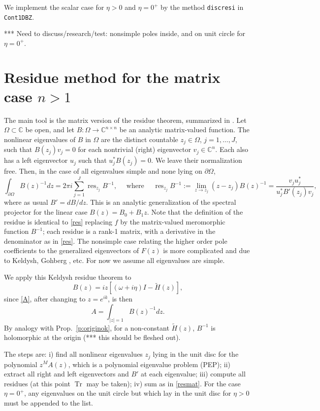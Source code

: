 \documentclass[11pt]{article}
\newcommand{\be}{\begin{equation}}
\newcommand{\ee}{\end{equation}}
\newcommand{\C}{\mathbb{C}}
\DeclareMathOperator{\tr}{Tr}
\DeclareMathOperator{\res}{res}
\newcommand{\om}{\omega}
\newcommand{\tH}{\tilde H}
\begin{document}
We implement the scalar case for $\eta>0$ and $\eta=0^+$
by the method \texttt{discresi} in \texttt{Cont1DBZ}.



*** Need to discuss/research/test: nonsimple poles inside, and on unit circle
for $\eta=0^+$.




\section{Residue method for the matrix case $n>1$}


The main tool is the matrix version of the residue theorem,
summarized in \cite[Thm.~2.9]{beyn12}.
Let $\Omega \subset \C$ be open, and let
$B: \Omega \to \C^{n\times n}$ be an analytic matrix-valued function.
The nonlinear eigenvalues of $B$ in $\Omega$ are the distinct
countable $z_j\in\Omega$, $j=1,\dots,J$, such that
$B(z_j)v_j = 0$ for each nontrivial (right) eigenvector $v_j\in\C^n$.
Each also has a left eigenvector $u_j$ such that $u_j^*B(z_j) = 0$.
We leave their normalization free.
Then, in the case of all eigenvalues simple and none lying on $\partial\Omega$,
\be
\int_{\partial\Omega} B(z)^{-1} dz =
2\pi i \sum_{j=1}^J \res_{z_j} B^{-1},
\quad \mbox{ where }
\quad
\res_{z_j} B^{-1} := \lim_{z\to z_j} (z-z_j)B(z)^{-1}
= \frac{v_j u_j^*}{u_j^* B'(z_j) v_j},
\label{resmat}
\ee
where as usual $B'=dB/dz$.
This is an analytic generalization of the spectral projector for the linear
case $B(z) = B_0 + B_1z$.
Note that the definition of the residue is identical
to \eqref{res} replacing $f$ by the matrix-valued meromorphic
function $B^{-1}$; each residue is a rank-1 matrix,
with a derivative in the denominator as in \eqref{res}.
The nonsimple case relating the higher order pole
coefficients to the generalized eigenvectors of $F(z)$
is more complicated and due to Keldysh, Gohberg \cite{gohberg}, etc.
For now we assume all eigenvalues are simple.

We apply this Keldysh residue theorem to
$$
B(z) = iz[(\om+i\eta)I - \tH(z)],
$$
since \eqref{A}, after changing to $z=e^{ik}$, is then
$$
A = \int_{|z|=1} B(z)^{-1} dz.
$$
By analogy with Prop.~\ref{p:originok}, for a non-constant $\tH(z)$, $B^{-1}$
is holomorphic at the origin (*** this should be fleshed out).

The steps are:
i) find all nonlinear eigenvalues $z_j$ lying in the unit disc
for the polynomial $z^MA(z)$,
which is a polynomial eigenvalue problem (PEP);
ii) extract all right and left eigenvectors and $B'$ at each eigenvalue;
iii) compute all residues (at this point $\tr$ may be taken);
iv) sum as in \eqref{resmat}.
For the case $\eta=0^+$, any eigenvalues on the unit circle
but which lay in the unit disc for $\eta>0$ must be appended to the list.








\end{document}
